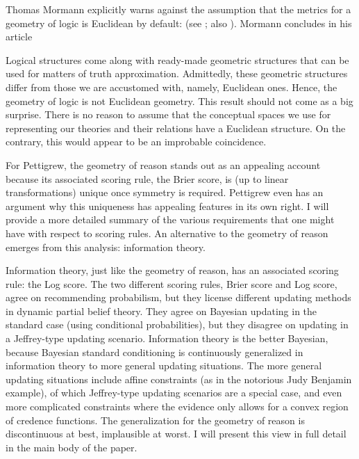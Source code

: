 \documentclass[12pt]{article}
\begin{document}
Thomas Mormann explicitly warns against the assumption that the
metrics for a geometry of logic is Euclidean by default:  (see
; also ). Mormann
concludes in his article 

\begin{quotex}
  Logical structures come along with ready-made geometric structures
  that can be used for matters of truth approximation. Admittedly,
  these geometric structures differ from those we are accustomed
  with, namely, Euclidean ones. Hence, the geometry of logic is not
  Euclidean geometry. This result should not come as a big surprise.
  There is no reason to assume that the conceptual spaces we use for
  representing our theories and their relations have a Euclidean
  structure. On the contrary, this would appear to be an improbable
  coincidence. 
\end{quotex}

For Pettigrew, the geometry of reason stands out as an appealing
account because its associated scoring rule, the Brier score, is (up
to linear transformations) unique once symmetry is required. Pettigrew
even has an argument why this uniqueness has appealing features in its
own right. I will provide a more detailed summary of the various
requirements that one might have with respect to scoring rules. An
alternative to the geometry of reason emerges from this analysis:
information theory.

Information theory, just like the geometry of reason, has an
associated scoring rule: the Log score. The two different scoring
rules, Brier score and Log score, agree on recommending probabilism,
but they license different updating methods in dynamic partial belief
theory. They agree on Bayesian updating in the standard case (using
conditional probabilities), but they disagree on updating in a
Jeffrey-type updating scenario. Information theory is the better
Bayesian, because Bayesian standard conditioning is continuously
generalized in information theory to more general updating situations.
The more general updating situations include affine constraints (as in
the notorious Judy Benjamin example), of which Jeffrey-type updating
scenarios are a special case, and even more complicated constraints
where the evidence only allows for a convex region of credence
functions. The generalization for the geometry of reason is
discontinuous at best, implausible at worst. I will present this view
in full detail in the main body of the paper.
\end{document}
